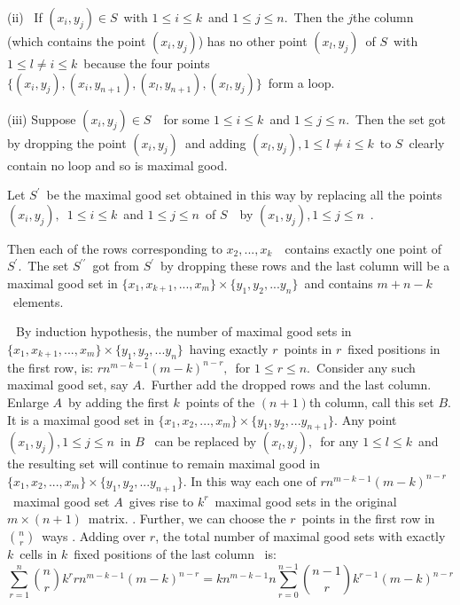 \documentclass{article}
\begin{document}
{\large (ii) \ If $(x_{i},y_{j})\in S$\ with $1\leq i\leq k$\ and $1\leq
j\leq n.$\ Then the $j$the column (which contains the point $(x_{i},y_{j})$)
has no other point $(x_{l},y_{j})$\ of $S$\ with $1\leq l\neq i\leq k$\
because the four points $%
\{(x_{i},y_{j}),(x_{i},y_{n+1}),(x_{l},y_{n+1}),(x_{l},y_{j})\}$\ form a
loop. }

{\large (iii) Suppose $(x_{i},y_{j})\in S$\ \ for some $1\leq i\leq k$\ and $%
1\leq j\leq n.$\ Then the set got by dropping the point $(x_{i},y_{j})$\ and
adding $(x_{l},y_{j}),1\leq l\neq i\leq k$\ to $S$\ clearly contain no loop
and so is maximal good. }

{\large Let $S^{\prime }$\ be the maximal good set obtained in this way by
replacing all the points $(x_{i},y_{j}),$\ $1\leq i\leq k$\ and $1\leq j\leq
n$\ of $S$\ \ by $(x_{1},y_{j}),1\leq j\leq n$\ . }

{\large Then each of the rows corresponding to $x_{2},...,x_{k}$\ \ contains
exactly one point of $S^{\prime }.$\ The set $S^{\prime \prime }$\ got from $%
S^{\prime }$\ by dropping these rows and the last column will be a maximal
good set in $\{x_{1},x_{k+1},...,x_{m}\}\times \{y_{1},y_{2},...y_{n}\}$\
and contains $m+n-k$\ elements. }

{\large $\ $\ By induction hypothesis, the number of maximal good sets in $%
\{x_{1},x_{k+1},...,x_{m}\}\times \{y_{1},y_{2},...y_{n}\}$\ having exactly $%
r$\ points in $r$\ fixed positions in the first row, is: $%
rn^{m-k-1}(m-k)^{n-r},$\ for $1\leq r\leq n.$\ Consider any such maximal
good set, say $A.$\ Further add the dropped rows and the last column.
Enlarge $A$\ by adding the first $k$\ points of the $(n+1)$th column, call
this set $B$. It is a maximal good set in $\{x_{1},x_{2},...,x_{m}\}\times
\{y_{1},y_{2},...y_{n+1}\}$. Any point $(x_{1},y_{j}),1\leq j\leq n$\ in $B$%
\ can be replaced by $(x_{l},y_{j}),$\ for any $1\leq l\leq k$\ and the
resulting set will continue to remain maximal good in $%
\{x_{1},x_{2},...,x_{m}\}\times \{y_{1},y_{2},...y_{n+1}\}$. In this way
each one of $rn^{m-k-1}(m-k)^{n-r}$\ maximal good set $A$\ gives rise to $%
k^{r}$\ maximal good sets in the original $m\times (n+1)$\ matrix. .
Further, we can choose the $r$\ points in the first row in $\binom{n}{r}$\
ways . Adding over $r$, the total number of maximal good sets with exactly $%
k $\ cells in $k$\ fixed positions of the last column \ is: $\ $%
\begin{equation*}
\sum_{r=1}^{n}\binom{n}{r}k^{r}rn^{m-k-1}(m-k)^{n-r}=kn^{m-k-1}n%
\sum_{r=0}^{n-1}\binom{n-1}{r}k^{r-1}(m-k)^{n-r}
\end{equation*}
}
\end{document}
